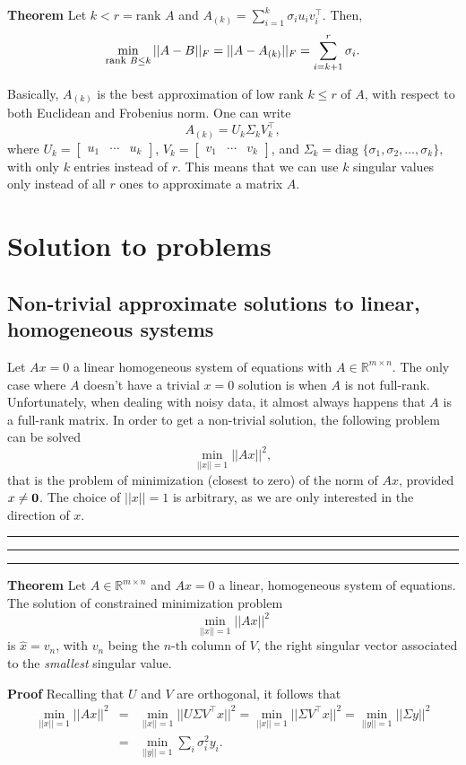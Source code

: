 \documentclass[10pt]{report}
\begin{document}
\textbf{Theorem} Let \(k < r = \mbox{rank }A\) and \(A_{(k)} = \sum_{i=1}^k \sigma_i u_i v^\top_i\). Then, $$\min_{\mbox{\footnotesize rank }B \leq k} ||A-B||_F = ||A - A_{(k)}||_F = \sum_{i=k+1}^r \sigma_{i}.$$

Basically, \(A_{(k)}\) is the best approximation of low rank \(k \leq r\) of \(A\), with respect to both Euclidean and Frobenius norm. One can write $$A_{(k)} = U_k \Sigma_k V^\top_k,$$ where \(U_k = \begin{bmatrix}u_1 & \cdots  & u_k\end{bmatrix}\), \(V_k = \begin{bmatrix}v_1 & \cdots  & v_k\end{bmatrix}\), and \(\Sigma_k = \mbox{diag }\{\sigma_1, \sigma_2, \dots, \sigma_k\},\) with only \(k\) entries instead of \(r\). This means that we can use \(k\) singular values only instead of all \(r\) ones to approximate a matrix \(A\).
\section{Solution to problems}
\label{sec:org7283afe}
\subsection{Non\--trivial approximate solutions to linear, homogeneous systems}
\label{sec:org04db35e}
Let \(Ax = 0\) a linear homogeneous system of equations with \(A \in \mathbb{R}^{m \times n}\). The only case where \(A\) doesn't have a trivial \(x=0\) solution is when \(A\) is not full\--rank. Unfortunately, when dealing with noisy data, it almost always happens that \(A\) is a full\--rank matrix. In order to get a non\--trivial solution, the following problem can be solved $$\min_{||x||=1} ||Ax||^2,$$ that is the problem of minimization (closest to zero) of the norm of \(Ax\), provided \(x \neq \bf 0\). The choice of \(||x|| = 1\) is arbitrary, as we are only interested in the direction of \(x\).

\vspace*{0.6cm}\hrule
\hrule
\hrule
\vspace*{0.4cm}
\textbf{Theorem} Let \(A\in\mathbb{R}^{m \times n}\) and \(Ax = 0\) a linear, homogeneous system of equations. The solution of constrained minimization problem $$\min_{||x||=1} ||Ax||^2$$ is \(\hat x = v_n\), with \(v_n\) being the \(n\mbox{-th}\) column of \(V\), the right singular vector associated to the \emph{smallest} singular value.

\textbf{Proof} Recalling that \(U\) and \(V\) are orthogonal, it follows that
$$\begin{array}{rcl} \min_{||x||=1} ||Ax||^2 & = & \min_{||x||=1} ||U\Sigma V^\top x||^2  = \min_{||x||=1} ||\Sigma V^\top x||^2 = \min_{||y||=1}||\Sigma y||^2 \\ & = & \min_{||y||=1} \sum_{i}\sigma^2_i y_i.\end{array}$$
\end{document}
